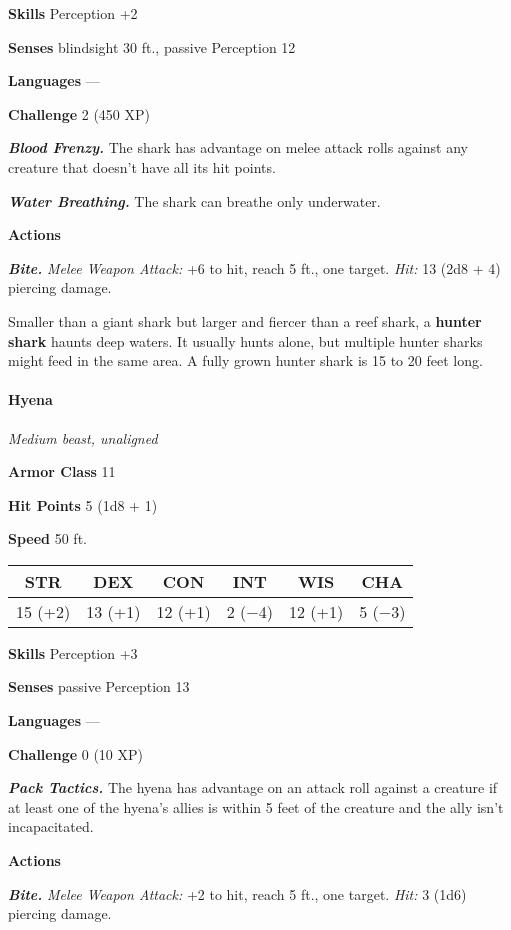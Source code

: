\documentclass[
]{article}
\begin{document}
\textbf{Skills} Perception +2

\textbf{Senses} blindsight 30 ft., passive Perception 12

\textbf{Languages} ---

\textbf{Challenge} 2 (450 XP)

\emph{\textbf{Blood Frenzy.}} The shark has advantage on melee attack
rolls against any creature that doesn't have all its hit points.

\emph{\textbf{Water Breathing.}} The shark can breathe only underwater.

\textbf{Actions}

\emph{\textbf{Bite.}} \emph{Melee Weapon Attack:} +6 to hit, reach 5
ft., one target. \emph{Hit:} 13 (2d8 + 4) piercing damage.

Smaller than a giant shark but larger and fiercer than a reef shark, a
\textbf{hunter shark} haunts deep waters. It usually hunts alone, but
multiple hunter sharks might feed in the same area. A fully grown hunter
shark is 15 to 20 feet long.

\hypertarget{hyena}{%
\paragraph{Hyena}\label{hyena}}

\emph{Medium beast, unaligned}

\textbf{Armor Class} 11

\textbf{Hit Points} 5 (1d8 + 1)

\textbf{Speed} 50 ft.

\begin{longtable}[]{@{}cccccc@{}}
\toprule
STR & DEX & CON & INT & WIS & CHA\tabularnewline
\midrule
\endhead
15 (+2) & 13 (+1) & 12 (+1) & 2 (−4) & 12 (+1) & 5 (−3)\tabularnewline
\bottomrule
\end{longtable}

\textbf{Skills} Perception +3

\textbf{Senses} passive Perception 13

\textbf{Languages} ---

\textbf{Challenge} 0 (10 XP)

\emph{\textbf{Pack Tactics.}} The hyena has advantage on an attack roll
against a creature if at least one of the hyena's allies is within 5
feet of the creature and the ally isn't incapacitated.

\textbf{Actions}

\emph{\textbf{Bite.}} \emph{Melee Weapon Attack:} +2 to hit, reach 5
ft., one target. \emph{Hit:} 3 (1d6) piercing damage.
\end{document}
